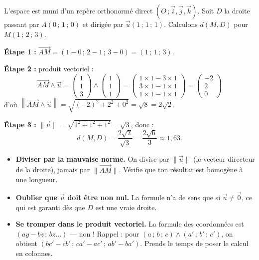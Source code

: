 \documentclass[11pt]{article}
\begin{document}
\begin{exemplebox}
L'espace est muni d'un repère orthonormé direct $(O\,;\vec{i},\vec{j},\vec{k})$. Soit $D$ la droite passant par $A(0\,;\,1\,;\,0)$ et dirigée par $\vec{u}(1\,;\,1\,;\,1)$. Calculons $d(M, D)$ pour $M(1\,;\,2\,;\,3)$.

\textbf{Étape 1 :} $\overrightarrow{AM} = (1-0\,;\,2-1\,;\,3-0) = (1\,;\,1\,;\,3)$.

\textbf{Étape 2 :} produit vectoriel :
\[ \overrightarrow{AM} \wedge \vec{u} = \begin{pmatrix} 1 \\ 1 \\ 3 \end{pmatrix} \wedge \begin{pmatrix} 1 \\ 1 \\ 1 \end{pmatrix} = \begin{pmatrix} 1 \times 1 - 3 \times 1 \\ 3 \times 1 - 1 \times 1 \\ 1 \times 1 - 1 \times 1 \end{pmatrix} = \begin{pmatrix} -2 \\ 2 \\ 0 \end{pmatrix} \]
d'où $\left\|\overrightarrow{AM} \wedge \vec{u}\right\| = \sqrt{(-2)^2 + 2^2 + 0^2} = \sqrt{8} = 2\sqrt{2}$.

\textbf{Étape 3 :} $\|\vec{u}\| = \sqrt{1^2+1^2+1^2} = \sqrt{3}$, donc :
\[ d(M, D) = \frac{2\sqrt{2}}{\sqrt{3}} = \frac{2\sqrt{6}}{3} \approx 1{,}63. \]
\end{exemplebox}

\begin{attention}
\begin{itemize}
\item \textbf{Diviser par la mauvaise norme.} On divise par $\|\vec{u}\|$ (le vecteur directeur de la droite), jamais par $\|\overrightarrow{AM}\|$. Vérifie que ton résultat est homogène à une longueur.
\item \textbf{Oublier que $\vec{u}$ doit être non nul.} La formule n'a de sens que si $\vec{u} \neq \vec{0}$, ce qui est garanti dès que $D$ est une vraie droite.
\item \textbf{Se tromper dans le produit vectoriel.} La formule des coordonnées est $(ay - bz\,;\, bz \ldots)$ — non ! Rappel : pour $(a\,;\,b\,;\,c) \wedge (a'\,;\,b'\,;\,c')$, on obtient $(bc' - cb'\,;\, ca' - ac'\,;\, ab' - ba')$. Prends le temps de poser le calcul en colonnes.
\end{itemize}
\end{attention}
\end{document}
